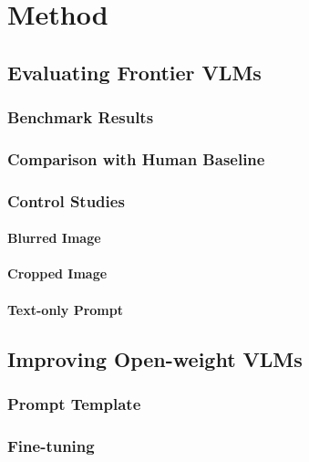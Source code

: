 \section{Method}
\label{sec:method}

\subsection{Evaluating Frontier VLMs}
\subsubsection{Benchmark Results}
\subsubsection{Comparison with Human Baseline}
\subsubsection{Control Studies}
\paragraph{Blurred Image}
\paragraph{Cropped Image}
\paragraph{Text-only Prompt}

\subsection{Improving Open-weight VLMs}
\subsubsection{Prompt Template}
\subsubsection{Fine-tuning}

